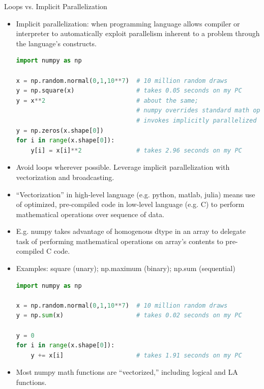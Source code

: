 \documentclass[aspectratio=1610,handout]{beamer}
\begin{document}
\begin{frame}{Loops vs. Implicit Parallelization}
    \begin{itemize}
        \item Implicit parallelization: when programming language allows compiler or interpreter to automatically exploit parallelism inherent to a problem through the language's constructs.
        \begin{lstlisting}[language=Python]
import numpy as np

x = np.random.normal(0,1,10**7)  # 10 million random draws
y = np.square(x)                 # takes 0.05 seconds on my PC
y = x**2                         # about the same;
                                 # numpy overrides standard math operators,
                                 # invokes implicitly parallelized functions
y = np.zeros(x.shape[0])
for i in range(x.shape[0]):
    y[i] = x[i]**2               # takes 2.96 seconds on my PC
        \end{lstlisting}
        \item Avoid loops wherever possible.  Leverage implicit parallelization with vectorization and broadcasting.
        \newpage
        \item ``Vectorization'' in high-level language (e.g. python, matlab, julia) means use of optimized, pre-compiled code in low-level language (e.g. C) to perform mathematical operations over sequence of data.
        \item E.g. numpy takes advantage of homogenous dtype in an array to delegate task of performing mathematical operations on array's contents to pre-compiled C code.
        \item Examples: square (unary); np.maximum (binary); np.sum (sequential)
        \begin{lstlisting}[language=Python]
import numpy as np

x = np.random.normal(0,1,10**7)  # 10 million random draws
y = np.sum(x)                    # takes 0.02 seconds on my PC

y = 0
for i in range(x.shape[0]):
    y += x[i]                    # takes 1.91 seconds on my PC
        \end{lstlisting}
        \item Most numpy math functions are ``vectorized,'' including logical and LA functions.
    \end{itemize}
\end{frame}
\end{document}
